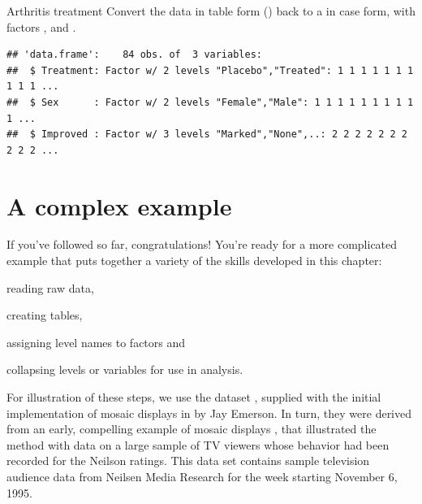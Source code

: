 \documentclass[11pt]{book}
\renewenvironment{knitrout}{\small\renewcommand{\baselinestretch}{.85}}{} %
\begin{document}
\begin{Example}{Arthritis treatment}
Convert the  data in table form () back to a 
in case form, with factors
,  and .
\begin{knitrout}
\color{fgcolor}\begin{kframe}
\begin{alltt}
 \hlkwb{<-} 
\end{alltt}
\begin{verbatim}
## 'data.frame':	84 obs. of  3 variables:
##  $ Treatment: Factor w/ 2 levels "Placebo","Treated": 1 1 1 1 1 1 1 1 1 1 ...
##  $ Sex      : Factor w/ 2 levels "Female","Male": 1 1 1 1 1 1 1 1 1 1 ...
##  $ Improved : Factor w/ 3 levels "Marked","None",..: 2 2 2 2 2 2 2 2 2 2 ...
\end{verbatim}
\end{kframe}
\end{knitrout}
\end{Example}


\section{A complex example}

If you've followed so far, congratulations! You're ready for a more complicated example
that puts together a variety of the skills developed in this chapter:
\begin{seriate}
  \item reading raw data, 
  \item creating tables, 
  \item assigning level names to factors and
  \item collapsing levels or variables for use in analysis.
\end{seriate}

For illustration of these steps, 
we use the dataset , supplied with
the initial implementation of 
mosaic displays in \R by Jay Emerson. 
In turn, they were derived from an early, compelling example of mosaic displays 
\citep{HartiganKleiner:84},
that illustrated the method with data on a large sample of TV viewers
whose behavior had been recorded for the Neilson ratings.
This data set contains sample television audience data from Neilsen
Media Research for the week starting November 6, 1995.
\end{document}
